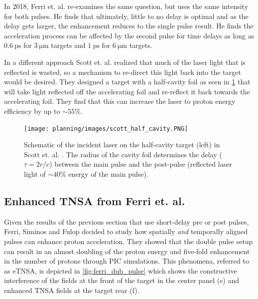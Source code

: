 In 2018, Ferri et. al. \cite{Ferri_2018_PoP} re-examines the same question, but uses the same intensity for both pulses. He finds that ultimately, little to no delay is optimal and as the delay gets larger, the enhancement reduces to the single pulse result. He finds the acceleration process can be affected by the second pulse for time delays as long as $\SI{0.6}{\pico \second}$ for $\SI{3}{\micro \meter}$ targets and $\SI{1}{\pico \second}$ for $\SI{6}{\micro \meter}$ targets. 

In a different approach Scott et. al. \cite{Scott_2012_APL} realized that much of the laser light that is reflected is wasted, so a mechanism to re-direct this light back into the target would be desired. They designed a target with a half-cavity foil as seen in \cref{fig:scott_half_cavity} that will take light reflected off the accelerating foil and re-reflect it back towards the accelerating foil. They find that this can increase the laser to proton energy efficiency by up to $\sim 55 \%$.

\begin{figure}
	\centering 
	\texttt{[image: planning/images/scott\_half\_cavity.PNG]}
	\caption{Schematic of the incident laser on the half-cavity target (left) in Scott et. al. \cite{Scott_2012_APL}. The radius of the cavity foil determines the delay ($\tau = 2 r/c$) between the main pulse and the post-pulse (reflected laser light of $\sim 40 \%$ energy of the main pulse).}
	\label{fig:scott_half_cavity}
\end{figure}



\subsection{Enhanced TNSA from Ferri et. al.}

Given the results of the previous section \cite{Markey_2010_PRL,Scott_2012_APL,Ferri_2018_PoP} that use short-delay pre or post pulses, Ferri, Siminos and Fulop decided to study how spatially \emph{and} temporally aligned pulses can enhance proton acceleration. They showed that the double pulse setup can result in an almost doubling of the proton energy and five-fold enhancement in the number of protons \cite{Ferri_2019_Nat_Comm} through \gls{PIC} simulations. This phenomena, referred to as \gls{eTNSA}, is depicted in \cref{fig:ferri_dub_pulse} which shows the constructive interference of the fields at the front of the target in the center panel (e) and enhanced \gls{TNSA} fields at the target rear (f).

